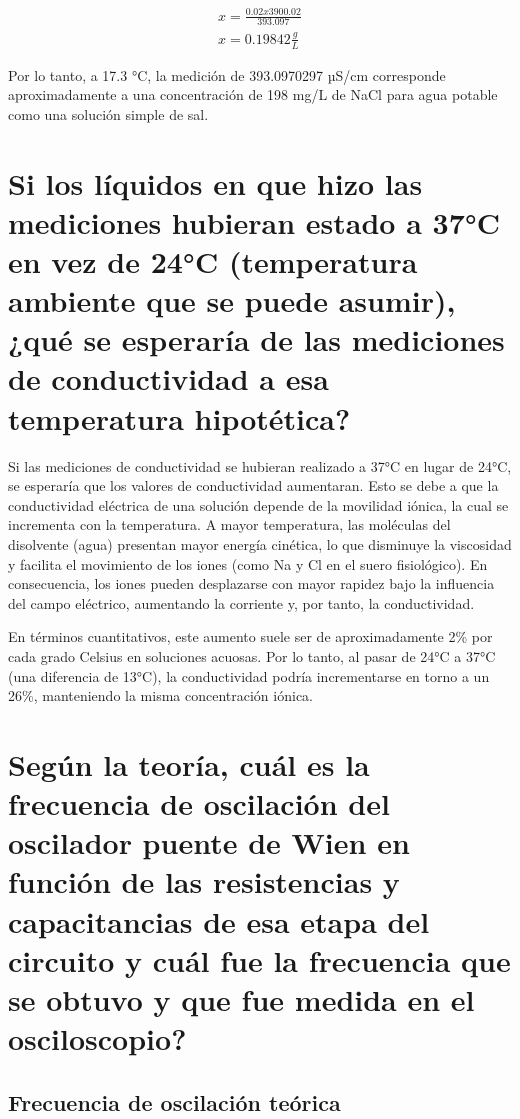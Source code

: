 \begin{align}
	x = \frac{0.02x3900.02}{393.097}\\
	x = 0.19842 \frac{g}{L}
\end{align}

Por lo tanto, a 17.3 °C, la medición de 393.0970297 µS/cm corresponde aproximadamente a una concentración de 198 mg/L de NaCl para agua potable como una solución simple de sal.


\section{Si los líquidos en que hizo las mediciones hubieran estado a 37°C en vez de 24°C (temperatura ambiente que se puede asumir), ¿qué se esperaría de las mediciones de conductividad a esa temperatura hipotética?}


Si las mediciones de conductividad se hubieran realizado a 37°C en lugar de 24°C, se esperaría que los valores de conductividad aumentaran. Esto se debe a que la conductividad eléctrica de una solución depende de la movilidad iónica, la cual se incrementa con la temperatura. A mayor temperatura, las moléculas del disolvente (agua) presentan mayor energía cinética, lo que disminuye la viscosidad y facilita el movimiento de los iones (como Na y Cl en el suero fisiológico). En consecuencia, los iones pueden desplazarse con mayor rapidez bajo la influencia del campo eléctrico, aumentando la corriente y, por tanto, la conductividad.

En términos cuantitativos, este aumento suele ser de aproximadamente 2\% por cada grado Celsius en soluciones acuosas. Por lo tanto, al pasar de 24°C a 37°C (una diferencia de 13°C), la conductividad podría incrementarse en torno a un 26\%, manteniendo la misma concentración iónica.






\section{Según la teoría, cuál es la frecuencia de oscilación del oscilador puente de Wien en función de las resistencias y capacitancias de esa etapa del circuito y cuál fue la frecuencia que se obtuvo y que fue medida en el osciloscopio?}

\subsection{Frecuencia de oscilación teórica}

